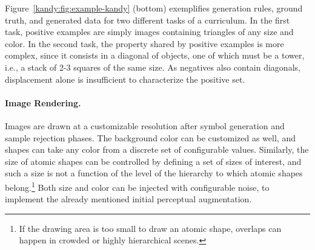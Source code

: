 Figure~\ref{kandy:fig:example-kandy} (bottom) exemplifies generation rules, ground truth, and generated data for two different tasks of a curriculum. In the first task, positive examples are simply images containing triangles of any size and color. In the second task, the property shared by positive examples is more complex, since it consists in a diagonal of objects, one of which must be a tower, i.e., a stack of 2-3 squares of the same size. As negatives also contain diagonals, displacement alone is insufficient to characterize the positive set.



\paragraph{Image Rendering.}
Images are drawn at a customizable resolution after symbol generation and sample rejection phases. The background color can be customized as well, and shapes can take any color from a discrete set of configurable values.
%
Similarly, the size of atomic shapes can be controlled by defining a set of sizes of interest, and such a size is not a function of the level of the hierarchy to which atomic shapes belong.\footnote{If the drawing area is too small to draw an atomic shape, overlaps can happen in crowded or highly hierarchical scenes.}
%
Both size and color can be injected with configurable noise, to implement the already mentioned initial perceptual augmentation.

